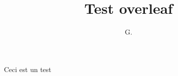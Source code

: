 \documentclass[a4paper,11pt]{article}
\title{Test overleaf}
\author{G.}
\begin{document}
\maketitle

Ceci est un test
\end{document}

